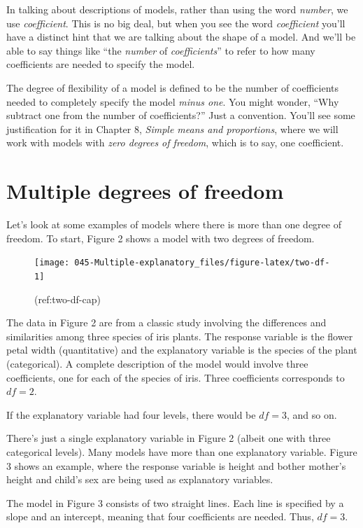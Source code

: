 \documentclass[]{book}
\begin{document}
In talking about descriptions of models, rather than using the word \emph{number}, we use \emph{coefficient}. This is no big deal, but when you see the word \emph{coefficient} you'll have a distinct hint that we are talking about the shape of a model. And we'll be able to say things like ``the \emph{number} of \emph{coefficients}'' to refer to how many coefficients are needed to specify the model.

The degree of flexibility of a model is defined to be the number of coefficients needed to completely specify the model \emph{minus one}. You might wonder, ``Why subtract one from the number of coefficients?'' Just a convention. You'll see some justification for it in Chapter 8, \emph{Simple means and proportions}, where we will work with models with \emph{zero degrees of freedom}, which is to say, one coefficient.

\hypertarget{multiple-degrees-of-freedom}{%
\section{Multiple degrees of freedom}\label{multiple-degrees-of-freedom}}

Let's look at some examples of models where there is more than one degree of freedom. To start, Figure 2 shows a model with two degrees of freedom.

\begin{figure}\texttt{[image: 045-Multiple-explanatory\_files/figure-latex/two-df-1]} \caption{(ref:two-df-cap)}\label{fig:two-df}
\end{figure}

The data in Figure 2 are from a classic study involving the differences and similarities among three species of iris plants. The response variable is the flower petal width (quantitative) and the explanatory variable is the species of the plant (categorical). A complete description of the model would involve three coefficients, one for each of the species of iris. Three coefficients corresponds to \(df = 2\).

If the explanatory variable had four levels, there would be \(df=3\), and so on.

There's just a single explanatory variable in Figure 2 (albeit one with three categorical levels). Many models have more than one explanatory variable. Figure 3 shows an example, where the response variable is height and bother mother's height and child's sex are being used as explanatory variables.

The model in Figure 3 consists of two straight lines. Each line is specified by a slope and an intercept, meaning that four coefficients are needed. Thus, \(df=3\).
\end{document}
